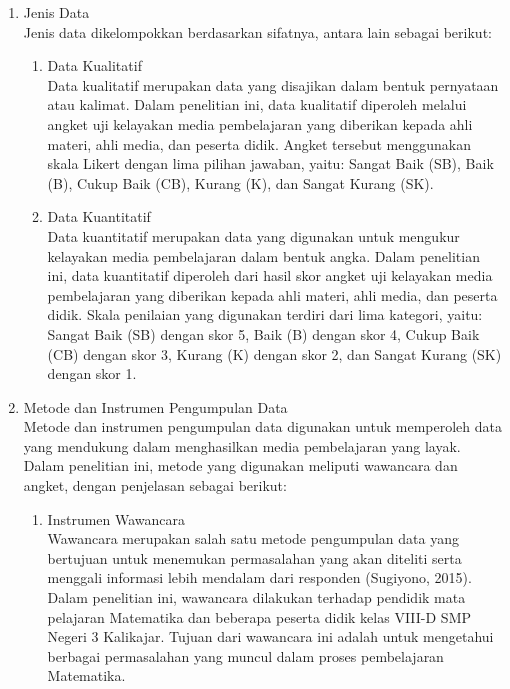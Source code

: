 \documentclass[12pt]{article}
\begin{document}
\begin{enumerate}
    \item Jenis Data\\
    \hspace*{1cm}Jenis data dikelompokkan berdasarkan sifatnya, antara lain sebagai berikut:
    \begin{enumerate}
        \item Data Kualitatif\\
        \hspace*{1cm}Data kualitatif merupakan data yang disajikan dalam bentuk pernyataan atau kalimat. Dalam penelitian ini, data kualitatif diperoleh melalui angket uji kelayakan media pembelajaran yang diberikan kepada ahli materi, ahli media, dan peserta didik. Angket tersebut menggunakan skala Likert dengan lima pilihan jawaban, yaitu: Sangat Baik (SB), Baik (B), Cukup Baik (CB), Kurang (K), dan Sangat Kurang (SK).
        \item Data Kuantitatif\\
        \hspace*{1cm}Data kuantitatif merupakan data yang digunakan untuk mengukur kelayakan media pembelajaran dalam bentuk angka. Dalam penelitian ini, data kuantitatif diperoleh dari hasil skor angket uji kelayakan media pembelajaran yang diberikan kepada ahli materi, ahli media, dan peserta didik. Skala penilaian yang digunakan terdiri dari lima kategori, yaitu: Sangat Baik (SB) dengan skor 5, Baik (B) dengan skor 4, Cukup Baik (CB) dengan skor 3, Kurang (K) dengan skor 2, dan Sangat Kurang (SK) dengan skor 1.
    \end{enumerate}
    \item Metode dan Instrumen Pengumpulan Data\\
    \hspace*{1cm}Metode dan instrumen pengumpulan data digunakan untuk memperoleh data yang mendukung dalam menghasilkan media pembelajaran yang layak. Dalam penelitian ini, metode yang digunakan meliputi wawancara dan angket, dengan penjelasan sebagai berikut:
    \begin{enumerate}
        \item Instrumen Wawancara\\
        \hspace*{1cm}Wawancara merupakan salah satu metode pengumpulan data yang bertujuan untuk menemukan permasalahan yang akan diteliti serta menggali informasi lebih mendalam dari responden (Sugiyono, 2015). Dalam penelitian ini, wawancara dilakukan terhadap pendidik mata pelajaran Matematika dan beberapa peserta didik kelas VIII-D SMP Negeri 3 Kalikajar. Tujuan dari wawancara ini adalah untuk mengetahui berbagai permasalahan yang muncul dalam proses pembelajaran Matematika.

\end{enumerate}
\end{enumerate}
\end{document}
